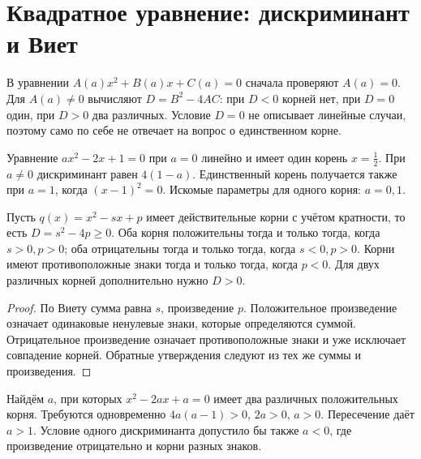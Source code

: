 \section{Квадратное уравнение: дискриминант и Виет}
В уравнении \(A(a)x^2+B(a)x+C(a)=0\) сначала проверяют \(A(a)=0\). Для \(A(a)\ne0\) вычисляют \(D=B^2-4AC\): при \(D<0\) корней нет, при \(D=0\) один, при \(D>0\) два различных. Условие \(D=0\) не описывает линейные случаи, поэтому само по себе не отвечает на вопрос о единственном корне.
\begin{example}Уравнение \(ax^2-2x+1=0\) при \(a=0\) линейно и имеет один корень \(x=\frac12\). При \(a\ne0\) дискриминант равен \(4(1-a)\). Единственный корень получается также при \(a=1\), когда \((x-1)^2=0\). Искомые параметры для одного корня: \(a=0,1\).\end{example}
\begin{theorem}
Пусть \(q(x)=x^2-sx+p\) имеет действительные корни с учётом кратности, то есть \(D=s^2-4p\geq0\). Оба корня положительны тогда и только тогда, когда \(s>0,p>0\); оба отрицательны тогда и только тогда, когда \(s<0,p>0\). Корни имеют противоположные знаки тогда и только тогда, когда \(p<0\). Для двух различных корней дополнительно нужно \(D>0\).
\end{theorem}
\begin{proof}По Виету сумма равна \(s\), произведение \(p\). Положительное произведение означает одинаковые ненулевые знаки, которые определяются суммой. Отрицательное произведение означает противоположные знаки и уже исключает совпадение корней. Обратные утверждения следуют из тех же суммы и произведения.\end{proof}
\begin{example}Найдём \(a\), при которых \(x^2-2ax+a=0\) имеет два различных положительных корня. Требуются одновременно \(4a(a-1)>0\), \(2a>0\), \(a>0\). Пересечение даёт \(a>1\). Условие одного дискриминанта допустило бы также \(a<0\), где произведение отрицательно и корни разных знаков.\end{example}

